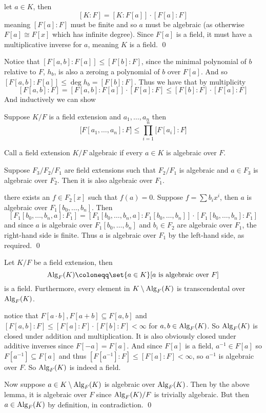 \eprop

\Proof let $a\in K$, then
$$ [K:F] = [K:F[a]]\cdot[F[a]:F] $$
meaning $[F[a]:F]$ must be finite and so $a$ must be algebraic (as otherwise $F[a]\cong F[x]$ which has infinite degree).
Since $F[a]$ is a field, it must have a multiplicative inverse for $a$, meaning $K$ is a field.
\qed

Notice that $[F[a,b]:F[a]]\leq[F[b]:F]$, since the minimal polynomial of $b$ relative to $F$, $h_b$, is also a zeroing a polynomial of $b$ over $F[a]$.
And so $[F[a,b]:F[a]]\leq\deg h_b=[F[b]:F]$.
Thus we have that by multiplicity
$$ [F[a,b]:F] = [F[a,b]:F[a]]\cdot[F[a]:F] \leq [F[b]:F]\cdot[F[a]:F] $$
And inductively we can show

\bprop

    Suppose $K/F$ is a field extension and $a_1,\dots,a_n$ then
    $$ \bigl[F[a_1,\dots,a_n]:F\bigr] \leq \prod_{i=1}^n\bigl[F[a_i]:F\bigr] $$

\eprop

\bdefn

    Call a field extension $K/F$ {\emphcolor algebraic} if every $a\in K$ is algebraic over $F$.

\edefn

\blemm

    Suppose $F_3/F_2/F_1$ are field extensions such that $F_2/F_1$ is algebraic and $a\in F_3$ is algebraic over $F_2$.
    Then it is also algebraic over $F_1$.

\elemm

\Proof there exists an $f\in F_2[x]$ such that $f(a)=0$.
Suppose $f=\sum b_ix^i$, then $a$ is algebraic over $F_1[b_0,\dots,b_n]$.
Then
$$ [F_1[b_0,\dots,b_n,a]:F_1] = [F_1[b_0,\dots,b_n,a]:F_1[b_0,\dots,b_n]]\cdot[F_1[b_0,\dots,b_n]:F_1] $$
and since $a$ is algebraic over $F_1[b_0,\dots,b_n]$ and $b_i\in F_2$ are algebraic over $F_1$, the right-hand side is finite.
Thus $a$ is algebraic over $F_1$ by the left-hand side, as required.
\qed

\bthrm

    Let $K/F$ be a field extension, then
    $$ {\rm Alg}_F(K) \coloneqq \set{a\in K}[\hbox{$a$ is algebraic over $F$}] $$
    is a field.
    Furthermore, every element in $K\setminus{\rm Alg}_F(K)$ is transcendental over ${\rm Alg}_F(K)$.

\ethrm

\Proof notice that $F[a\cdot b],F[a+b]\subseteq F[a,b]$ and $[F[a,b]:F]\leq[F[a]:F]\cdot[F[b]:F]<\infty$ for $a,b\in{\rm Alg}_F(K)$.
So ${\rm Alg}_F(K)$ is closed under addition and multiplication.
It is also obviously closed under additive inverses since $F[-a]=F[a]$.
And since $F[a]$ is a field, $a^{-1}\in F[a]$ so $F[a^{-1}]\subseteq F[a]$ and thus $[F[a^{-1}]:F]\leq[F[a]:F]<\infty$, so $a^{-1}$ is algebraic over $F$.
So ${\rm Alg}_F(K)$ is indeed a field.

Now suppose $a\in K\setminus{\rm Alg}_F(K)$ is algebraic over ${\rm Alg}_F(K)$.
Then by the above lemma, it is algebraic over $F$ since ${\rm Alg}_F(K)/F$ is trivially algebraic.
But then $a\in{\rm Alg}_F(K)$ by definition, in contradiction.
\qed

